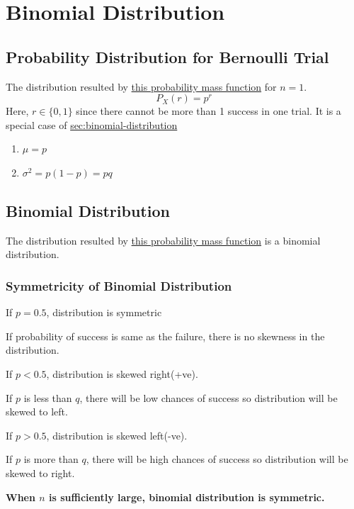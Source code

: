\chapter{Binomial Distribution}
\label{chap:binomial-distribution}



\section{Probability Distribution for Bernoulli Trial}
\label{sec:bernoulli-distribution}
The distribution resulted by \hyperref[eqn:binomial-distribution]{this probability mass
function} for \(n=1\).
\[ P_X(r) = p^{r} \] Here, \(r\in \{0,1\} \) since there cannot be more than 1
success in one trial. It is a special case of \href{Binomial
Distribution}{sec:binomial-distribution}

\begin{enumerate}
  \item \(\mu=p\)
  \item \(\sigma^{2}=p(1-p)=pq\)
\end{enumerate}

\section{Binomial Distribution}
\label{sec:binomial-distribution}
The distribution resulted by
\hyperref[eqn:binomial-distribution]{this probability mass
function} is a binomial distribution.

\subsection{Symmetricity of Binomial Distribution}
\label{ssec:symmetricity-of-binomial-distribution}

\begin{remark}
  If \(p=0.5\), distribution is symmetric\\
  \begin{explanation}
    If probability of success is same as the failure, there
    is no skewness in the distribution.\\
  \end{explanation}

  If \(p<0.5\), distribution is skewed right(+ve).
  \begin{explanation}
    If \(p\) is less than \(q\), there will be low chances
    of success so distribution will be skewed to left.\\
  \end{explanation}

  If \(p>0.5\), distribution is skewed left(-ve).
  \begin{explanation}
    If \(p\) is more than \(q\), there will be high chances
    of success so distribution will be skewed to right.\\
  \end{explanation}

  \textbf{When \(n\) is sufficiently large, binomial distribution is symmetric.}
\end{remark}


